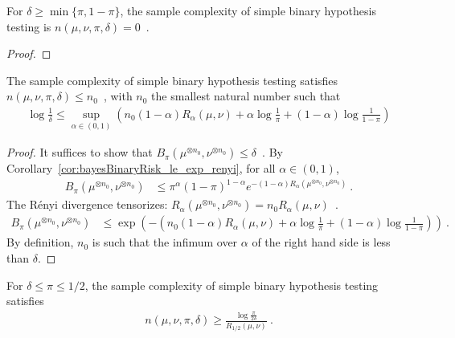 \begin{lemma}
  \label{lem:binaryPriorSampleComplexity_eq_zero}
  For $\delta \ge \min\{\pi, 1 - \pi\}$, the sample complexity of simple binary hypothesis testing is
  $n(\mu, \nu, \pi, \delta) = 0$~.
\end{lemma}

\begin{proof}
\end{proof}


\begin{lemma}
  \label{lem:binaryPriorSampleComplexity_le_renyi}
  The sample complexity of simple binary hypothesis testing satisfies $n(\mu, \nu, \pi, \delta) \le n_0$~, with $n_0$ the smallest natural number such that
  \begin{align*}
  \log\frac{1}{\delta}
  \le \sup_{\alpha \in (0,1)} \left( n_0 (1 - \alpha)R_\alpha(\mu, \nu) + \alpha\log\frac{1}{\pi} + (1 - \alpha)\log\frac{1}{1 - \pi} \right)
  \end{align*}
\end{lemma}

\begin{proof}%
{}
It suffices to show that $B_\pi(\mu^{\otimes n_0}, \nu^{\otimes n_0}) \le \delta$~.
By Corollary~\ref{cor:bayesBinaryRisk_le_exp_renyi}, for all $\alpha \in (0,1)$,
\begin{align*}
B_\pi(\mu^{\otimes n_0}, \nu^{\otimes n_0})
&\le \pi^{\alpha} (1 - \pi)^{1 - \alpha}e^{- (1 - \alpha)R_\alpha(\mu^{\otimes n_0}, \nu^{\otimes n_0})}
\: .
\end{align*}
The Rényi divergence tensorizes: $R_\alpha(\mu^{\otimes n_0}, \nu^{\otimes n_0}) = n_0 R_\alpha(\mu, \nu)$~.
\begin{align*}
B_\pi(\mu^{\otimes n_0}, \nu^{\otimes n_0})
&\le \exp\left(- \left( n_0 (1 - \alpha)R_\alpha(\mu, \nu) + \alpha\log\frac{1}{\pi} + (1 - \alpha)\log\frac{1}{1 - \pi} \right) \right)
\: .
\end{align*}
By definition, $n_0$ is such that the infimum over $\alpha$ of the right hand side is less than $\delta$.
\end{proof}


\begin{lemma}
  \label{lem:binaryPriorSampleComplexity_ge_renyi}
  For $\delta \le \pi \le 1/2$, the sample complexity of simple binary hypothesis testing satisfies
  \begin{align*}
  n(\mu, \nu, \pi, \delta) \ge \frac{\log\frac{\pi}{2\delta}}{R_{1/2}(\mu, \nu)}
  \: .
  \end{align*}
\end{lemma}

